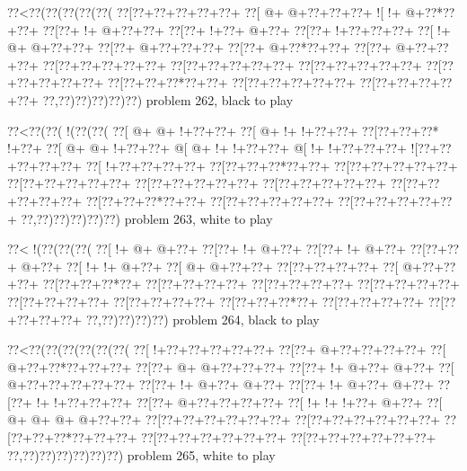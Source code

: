 \vbox{\vbox{\goo
\0??<\0??(\0??(\0??(\0??(\0??(
\0??[\0??+\0??+\0??+\0??+\0??+
\0??[\- @+\- @+\0??+\0??+\0??+
\- ![\- !+\- @+\0??*\0??+\0??+
\0??[\0??+\- !+\- @+\0??+\0??+
\0??[\0??+\- !+\0??+\- @+\0??+
\0??[\0??+\- !+\0??+\0??+\0??+
\0??[\- !+\- @+\- @+\0??+\0??+
\0??[\0??+\- @+\0??+\0??+\0??+
\0??[\0??+\- @+\0??*\0??+\0??+
\0??[\0??+\- @+\0??+\0??+\0??+
\0??[\0??+\0??+\0??+\0??+\0??+
\0??[\0??+\0??+\0??+\0??+\0??+
\0??[\0??+\0??+\0??+\0??+\0??+
\0??[\0??+\0??+\0??+\0??+\0??+
\0??[\0??+\0??+\0??*\0??+\0??+
\0??[\0??+\0??+\0??+\0??+\0??+
\0??[\0??+\0??+\0??+\0??+\0??+
\0??,\0??)\0??)\0??)\0??)\0??)
}
\hfil problem 262, black to play\hfil\break
}

\vbox{\vbox{\goo
\0??<\0??(\0??(\- !(\0??(\0??(
\0??[\- @+\- @+\- !+\0??+\0??+
\0??[\- @+\- !+\- !+\0??+\0??+
\0??[\0??+\0??+\0??*\- !+\0??+
\0??[\- @+\- @+\- !+\0??+\0??+
\- @[\- @+\- !+\- !+\0??+\0??+
\- @[\- !+\- !+\0??+\0??+\0??+
\- ![\0??+\0??+\0??+\0??+\0??+
\0??[\- !+\0??+\0??+\0??+\0??+
\0??[\0??+\0??+\0??*\0??+\0??+
\0??[\0??+\0??+\0??+\0??+\0??+
\0??[\0??+\0??+\0??+\0??+\0??+
\0??[\0??+\0??+\0??+\0??+\0??+
\0??[\0??+\0??+\0??+\0??+\0??+
\0??[\0??+\0??+\0??+\0??+\0??+
\0??[\0??+\0??+\0??*\0??+\0??+
\0??[\0??+\0??+\0??+\0??+\0??+
\0??[\0??+\0??+\0??+\0??+\0??+
\0??,\0??)\0??)\0??)\0??)\0??)
}
\hfil problem 263, white to play\hfil\break
}

\vbox{\vbox{\goo
\0??<\- !(\0??(\0??(\0??(
\0??[\- !+\- @+\- @+\0??+
\0??[\0??+\- !+\- @+\0??+
\0??[\0??+\- !+\- @+\0??+
\0??[\0??+\0??+\- @+\0??+
\0??[\- !+\- !+\- @+\0??+
\0??[\- @+\- @+\0??+\0??+
\0??[\0??+\0??+\0??+\0??+
\0??[\- @+\0??+\0??+\0??+
\0??[\0??+\0??+\0??*\0??+
\0??[\0??+\0??+\0??+\0??+
\0??[\0??+\0??+\0??+\0??+
\0??[\0??+\0??+\0??+\0??+
\0??[\0??+\0??+\0??+\0??+
\0??[\0??+\0??+\0??+\0??+
\0??[\0??+\0??+\0??*\0??+
\0??[\0??+\0??+\0??+\0??+
\0??[\0??+\0??+\0??+\0??+
\0??,\0??)\0??)\0??)\0??)
}
\hfil problem 264, black to play\hfil\break
}

\vbox{\vbox{\goo
\0??<\0??(\0??(\0??(\0??(\0??(\0??(
\0??[\- !+\0??+\0??+\0??+\0??+\0??+
\0??[\0??+\- @+\0??+\0??+\0??+\0??+
\0??[\- @+\0??+\0??*\0??+\0??+\0??+
\0??[\0??+\- @+\- @+\0??+\0??+\0??+
\0??[\0??+\- !+\- @+\0??+\- @+\0??+
\0??[\- @+\0??+\0??+\0??+\0??+\0??+
\0??[\0??+\- !+\- @+\0??+\- @+\0??+
\0??[\0??+\- !+\- @+\0??+\- @+\0??+
\0??[\0??+\- !+\- !+\0??+\0??+\0??+
\0??[\0??+\- @+\0??+\0??+\0??+\0??+
\0??[\- !+\- !+\- !+\0??+\- @+\0??+
\0??[\- @+\- @+\- @+\- @+\0??+\0??+
\0??[\0??+\0??+\0??+\0??+\0??+\0??+
\0??[\0??+\0??+\0??+\0??+\0??+\0??+
\0??[\0??+\0??+\0??*\0??+\0??+\0??+
\0??[\0??+\0??+\0??+\0??+\0??+\0??+
\0??[\0??+\0??+\0??+\0??+\0??+\0??+
\0??,\0??)\0??)\0??)\0??)\0??)\0??)
}
\hfil problem 265, white to play\hfil\break
}

